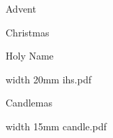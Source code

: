

\vfill


%
%

\eject


\beginpart Advent



\paginaproxima


\bigskip


\paginaproxima

\beginpart Christmas


\paginaproxima


\paginaproxima


\paginaproxima

\beginpart Holy Name


\bigskip



\saveimageresource width 20mm {ihs.pdf}

\centerline{\useimageresource \lastsavedimageresourceindex}



\eject


\bigskip

\bigskip



\eject

\beginpart Candlemas


\bigskip

\saveimageresource width 15mm {candle.pdf}

\centerline{\useimageresource \lastsavedimageresourceindex}




